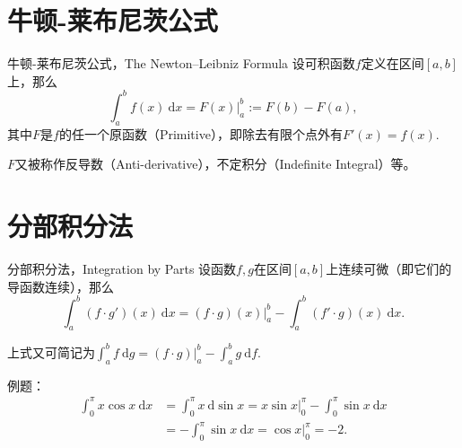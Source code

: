 
\section{牛顿-莱布尼茨公式}


\begin{frame}

\begin{block}{牛顿-莱布尼茨公式，The Newton–Leibniz Formula}
设可积函数$f$定义在区间$[a,b]$上，那么
\[\int_a^b f(x) ~ \mathrm{d}x = \left.F(x)\right\vert_a^b := F(b) - F(a),\]
其中$F$是$f$的任一个原函数（Primitive），即{\color{zkblue!50}除去有限个点外有}$F'(x) = f(x)$.
\end{block}

\vspace{2em}
\pause

$F$又被称作反导数（Anti-derivative），不定积分（Indefinite Integral）等。

\end{frame}



\section{分部积分法}


\begin{frame}

\begin{block}{分部积分法，Integration by Parts}
设函数$f,g$在区间$[a,b]$上连续可微（即它们的导函数连续），那么
\[\int_a^b (f\cdot g')(x) ~ \mathrm{d}x = (f\cdot g)(x)|_a^b - \int_a^b (f'\cdot g)(x) ~ \mathrm{d}x.\]

\pause

上式又可简记为\(\displaystyle \int_a^b f ~ \mathrm{d}g = (f\cdot g)|_a^b - \int_a^b g ~ \mathrm{d}f.\)
\end{block}

\pause

例题：
\begin{align*}
\int_0^{\pi} x \cos x ~ \mathrm{d}x & = \int_0^{\pi} x ~ \mathrm{d}\sin x = x\sin x|_0^{\pi} - \int_0^{\pi} \sin x ~ \mathrm{d}x \\
& = - \int_0^{\pi} \sin x ~ \mathrm{d}x = \cos x|_0^{\pi} = -2.
\end{align*}

\end{frame}

